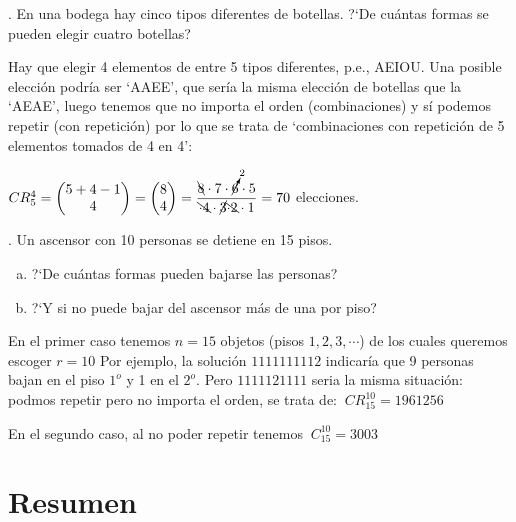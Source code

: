 \begin{example}
	.  En una bodega hay cinco tipos diferentes de botellas. ?`De cuántas formas se pueden elegir cuatro botellas?	
	
	\vspace{4mm} Hay que elegir 4 elementos de entre 5 tipos diferentes, p.e., AEIOU. Una posible elección podría ser `AAEE', que sería la misma elección de botellas que la `AEAE', luego tenemos que no importa el orden (combinaciones) y sí podemos repetir (con repetición) por lo que se trata de `combinaciones con repetición de 5 elementos tomados de 4 en 4':
	
	\vspace{2mm} $CR_5^4=\mqty(5+4-1\\4)=\mqty(8\\4)=\dfrac{\bcancel{8} \cdot 7\cdot \cancelto{2}{6} \cdot 5}{\bcancel{\cdot 4} \cdot \cancel{3} \bcancel{\cdot 2} \cdot 1}= 70$ elecciones.
\end{example}

\begin{example}
	. Un ascensor con 10 personas se detiene en 15 pisos.
	
	\begin{enumerate}[a) ]
	\vspace{-3mm} \item ?`De cuántas formas pueden bajarse las personas?
	\vspace{-3mm} \item ?`Y si no puede bajar del ascensor más de una por piso?	
	\end{enumerate}

	En el primer caso tenemos $n=15$ objetos (pisos $1,2,3,\cdots$) de los cuales queremos escoger $r=10$ Por ejemplo, la solución $1111111112$ indicaría que 9 personas bajan en el piso $1^o$ y 1 en el $2^o$. Pero $1111121111$ seria la misma situación: podmos repetir pero no importa el orden, se trata de: $\ CR_{15}^{10}=1961256$
	
	\vspace{2mm} En el segundo caso, al no poder repetir tenemos $\ C_{15}^{10}=3003$
\end{example}


	
\section{Resumen}

